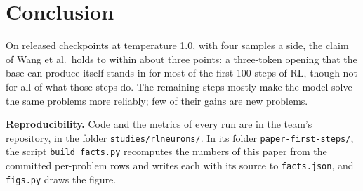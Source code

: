 \documentclass[10pt]{article}
\begin{document}
\section{Conclusion}

On released checkpoints at temperature 1.0, with four samples a side, the claim of Wang et al.\ holds to within
about three points: a three-token opening that the base can produce itself stands in for most of the first 100
steps of RL, though not for all of what those steps do. The remaining steps mostly make the model solve the same
problems more reliably; few of their gains are new problems.

{\small\sloppy
\textbf{Reproducibility.} Code and the metrics of every run are in the team's repository, in the folder \texttt{studies/rlneurons/}. In its folder \texttt{paper-first-steps/}, the script \texttt{build\_facts.py}
recomputes the numbers of this paper from the committed per-problem rows and writes each with its source to
\texttt{facts.json}, and \texttt{figs.py} draws the figure.\par
}

{\footnotesize


}
\end{document}
